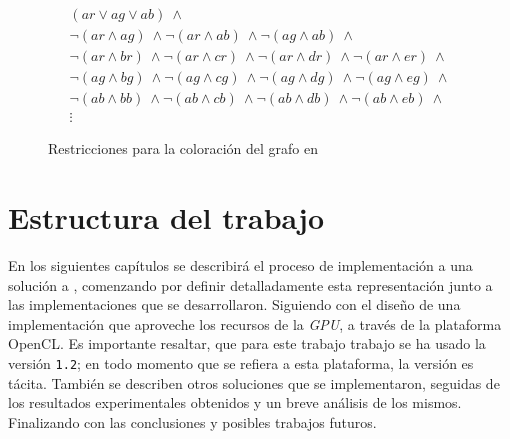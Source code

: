 \begin{figure}
\begin{align*}
    (ar \lor ag \lor ab)\ \land\\
    \neg(ar \land ag)\ \land \neg(ar \land ab)\ \land \neg(ag \land ab)\ \land\\
    \neg(ar \land br)\ \land \neg(ar \land cr)\ \land \neg(ar \land dr)\ \land \neg(ar \land er)\ \land\\
    \neg(ag \land bg)\ \land \neg(ag \land cg)\ \land \neg(ag \land dg)\ \land \neg(ag \land eg)\ \land\\
    \neg(ab \land bb)\ \land \neg(ab \land cb)\ \land \neg(ab \land db)\ \land \neg(ab \land eb)\ \land\\
    \vdots
\end{align*}
\caption{Restricciones para la coloración del grafo en \sat}
\label{fig:g_col_sat}
\end{figure}

\section{Estructura del trabajo}

En los siguientes capítulos se describirá el proceso de implementación a una solución a \sat, comenzando por definir detalladamente esta representación junto a las implementaciones que se desarrollaron. Siguiendo con el diseño de una implementación que aproveche los recursos de la \textit{GPU}, a través de la plataforma OpenCL. Es importante resaltar, que para este trabajo trabajo se ha usado la versión \texttt{1.2}; en todo momento que se refiera a esta plataforma, la versión es tácita. También se describen otros soluciones que se implementaron, seguidas de los resultados experimentales obtenidos y un breve análisis de los mismos. Finalizando con las conclusiones y posibles trabajos futuros.
